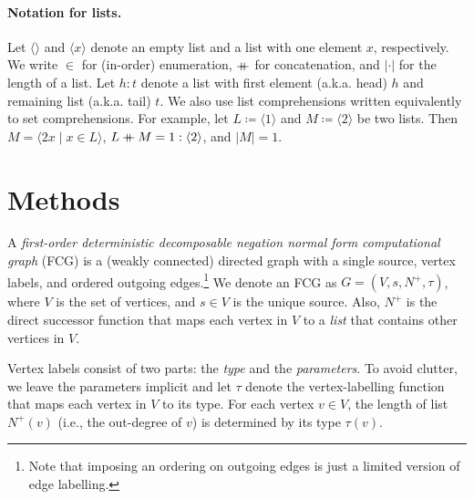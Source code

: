 \paragraph{Notation for lists.}
Let $\langle\rangle$ and $\langle x \rangle$ denote an empty list and a list
with one element $x$, respectively. We write $\in$ for (in-order) enumeration,
$\mathbin{+\mkern-10mu+}$ for concatenation, and $|\cdot|$ for the length of a list. Let
$h : t$ denote a list with first element (a.k.a. head) $h$ and remaining list
(a.k.a. tail) $t$. We also use list comprehensions written equivalently to set
comprehensions. For example, let $L \coloneqq \langle 1 \rangle$ and
$M \coloneqq \langle 2 \rangle$ be two lists. Then
$M = \langle 2x \mid x \in L \rangle$,
$L \mathbin{+\mkern-10mu+} M = 1 : \langle 2 \rangle$, and $|M| = 1$.

\section{Methods}



A \emph{first-order deterministic decomposable negation normal form
  computational graph} (FCG) is a (weakly connected) directed graph with a
single source, vertex labels, and ordered outgoing edges.\footnote{Note that
  imposing an ordering on outgoing edges is just a limited version of edge
  labelling.} We denote an FCG as $G = (V, s, N^+, \tau)$, where $V$ is the set
of vertices, and $s \in V$ is the unique source. Also, $N^+$ is the direct
successor function that maps each vertex in $V$ to a \emph{list} that contains
other vertices in $V$.

Vertex labels consist of two parts: the \emph{type} and the \emph{parameters}.
To avoid clutter, we leave the parameters implicit and let $\tau$ denote the
vertex-labelling function that maps each vertex in $V$ to its type. For each
vertex $v \in V$, the length of list $N^+(v)$ (i.e., the out-degree of $v$) is
determined by its type $\tau(v)$.

